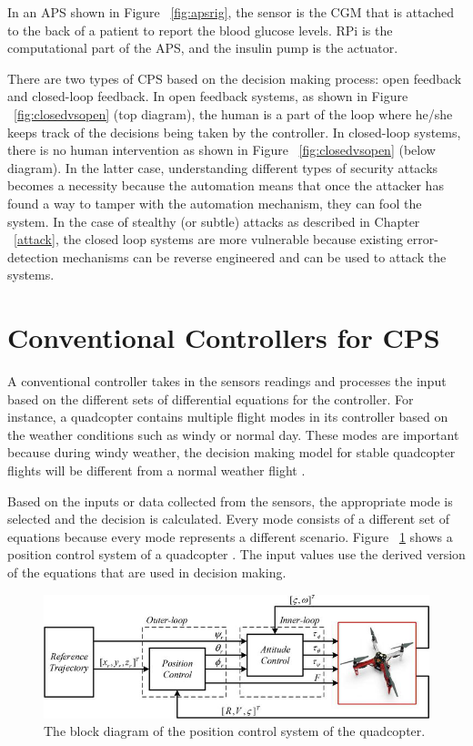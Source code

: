 In an \ac{APS} shown in Figure ~\ref{fig:apsrig}, the sensor is the \ac{CGM} that is attached to the back of a patient to report the blood glucose levels.  
\ac{RPi} is the computational part of the \ac{APS}, and the insulin pump is the actuator. 

There are two types of CPS based on the decision making process: open feedback and closed-loop feedback.
In open feedback systems, 
as shown in Figure ~\ref{fig:closedvsopen} (top diagram), the human is a part of the loop where he/she keeps track of the decisions being taken by the controller. 
In closed-loop systems, there is no human intervention 
as shown in Figure ~\ref{fig:closedvsopen} (below diagram). 
In the latter case, understanding different types of security attacks becomes a necessity because the automation means that once the attacker has found a way to tamper with the automation mechanism, they can fool the system. 
In the case of stealthy (or subtle) attacks as described in Chapter ~\ref{attack}, 
the closed loop systems are more vulnerable because existing error-detection mechanisms can be reverse engineered and can be used to attack the systems. 

\section{Conventional Controllers for CPS}

A conventional controller takes in the sensors readings and processes the input based on the different sets of differential equations for the controller. 
For instance, a quadcopter contains multiple flight modes in its controller based on the weather conditions such as windy or normal day. 
These modes are important because during windy weather, the decision making model for stable quadcopter flights will be different from a normal weather flight \cite{inbook}. 

Based on the inputs or data collected from the sensors, the appropriate  mode is selected and the decision is calculated. 
Every mode consists of a different set of equations because every mode represents a different scenario.
Figure ~\ref{fig:controltheory} shows a position control system of a quadcopter \cite{inbook}. The input values use the derived version of the equations that are used in decision making. 

\begin{figure}
	\centering
	\includegraphics[width=0.7\linewidth]{Images/controltheory}
	\caption{The block diagram of the position control system of the quadcopter.
	}
	\label{fig:controltheory} 
\end{figure}


